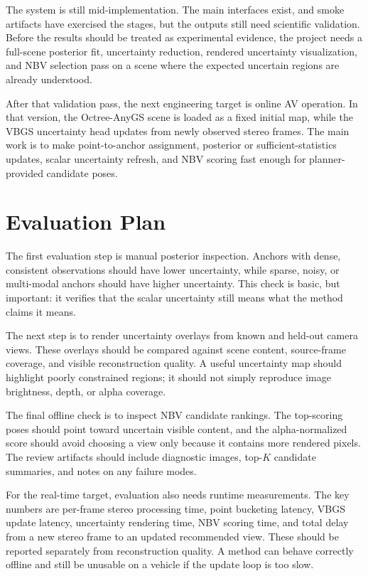 \documentclass{article}
\begin{document}
The system is still mid-implementation. The main interfaces exist, and smoke artifacts have exercised the stages, but the outputs still need scientific validation. Before the results should be treated as experimental evidence, the project needs a full-scene posterior fit, uncertainty reduction, rendered uncertainty visualization, and NBV selection pass on a scene where the expected uncertain regions are already understood.

After that validation pass, the next engineering target is online AV operation. In that version, the Octree-AnyGS scene is loaded as a fixed initial map, while the VBGS uncertainty head updates from newly observed stereo frames. The main work is to make point-to-anchor assignment, posterior or sufficient-statistics updates, scalar uncertainty refresh, and NBV scoring fast enough for planner-provided candidate poses.

\section{Evaluation Plan}
The first evaluation step is manual posterior inspection. Anchors with dense, consistent observations should have lower uncertainty, while sparse, noisy, or multi-modal anchors should have higher uncertainty. This check is basic, but important: it verifies that the scalar uncertainty still means what the method claims it means.

The next step is to render uncertainty overlays from known and held-out camera views. These overlays should be compared against scene content, source-frame coverage, and visible reconstruction quality. A useful uncertainty map should highlight poorly constrained regions; it should not simply reproduce image brightness, depth, or alpha coverage.

The final offline check is to inspect NBV candidate rankings. The top-scoring poses should point toward uncertain visible content, and the alpha-normalized score should avoid choosing a view only because it contains more rendered pixels. The review artifacts should include diagnostic images, top-\(K\) candidate summaries, and notes on any failure modes.

For the real-time target, evaluation also needs runtime measurements. The key numbers are per-frame stereo processing time, point bucketing latency, VBGS update latency, uncertainty rendering time, NBV scoring time, and total delay from a new stereo frame to an updated recommended view. These should be reported separately from reconstruction quality. A method can behave correctly offline and still be unusable on a vehicle if the update loop is too slow.
\end{document}
